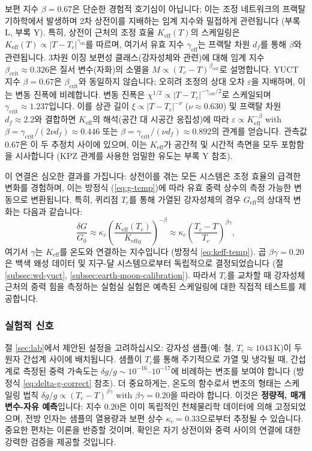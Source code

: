 \documentclass[11pt,a4paper]{article}
\newcommand{\Keff}{K_{\mathrm{eff}}}
\begin{document}
	보편 지수 $\beta = 0.67$은 단순한 경험적 호기심이 아닙니다; 이는 조정 네트워크의 프랙탈 기하학에서 발생하며 2차 상전이를 지배하는 임계 지수와 밀접하게 관련됩니다 (부록 L, 부록 Y). 특히, 상전이 근처의 조정 효율 $\Keff(T)$의 스케일링은 $\Keff(T) \propto |T - T_c|^{\gamma_{\mathrm{eff}}}$를 따르며, 여기서 유효 지수 $\gamma_{\mathrm{eff}}$는 프랙탈 차원 $d_f$를 통해 $\beta$와 관련됩니다. 3차원 이징 보편성 클래스(강자성체와 관련)에 대해 임계 지수 $\beta_{\mathrm{crit}} \approx 0.326$은 질서 변수(자화)의 소멸을 $M \propto (T_c - T)^{\beta_{\mathrm{crit}}}$로 설명합니다. YUCT 지수 $\beta = 0.67$은 $\beta_{\mathrm{crit}}$와 동일하지 않습니다; 오히려 조정의 상대 오차 $\varepsilon$을 지배하며, 이는 변동 진폭에 비례합니다. 변동 진폭은 $\chi^{1/2} \propto |T - T_c|^{-\gamma_{\mathrm{crit}}/2}$로 스케일되며 $\gamma_{\mathrm{crit}} \approx 1.237$입니다. 이를 상관 길이 $\xi \propto |T - T_c|^{-\nu}$ ($\nu \approx 0.630$) 및 프랙탈 차원 $d_f \approx 2.2$와 결합하면 $\Keff$의 해석(공간 대 시공간 응집성)에 따라 $\varepsilon \propto \Keff^{-\beta}$ with $\beta = \gamma_{\mathrm{crit}}/(2\nu d_f) \approx 0.446$ 또는 $\beta = \gamma_{\mathrm{crit}}/(\nu d_f) \approx 0.892$의 관계를 얻습니다. 관측값 0.67은 이 두 추정치 사이에 있으며, 이는 $\Keff$가 공간적 및 시간적 측면을 모두 포함함을 시사합니다 (KPZ 관계를 사용한 엄밀한 유도는 부록 Y 참조).
	
	이 연결은 심오한 결과를 가집니다: 상전이를 겪는 모든 시스템은 조정 효율의 급격한 변화를 경험하며, 이는 방정식 (\ref{eq:g-temp})에 따라 유효 중력 상수의 측정 가능한 변동으로 변환됩니다. 특히, 퀴리점 $T_c$를 통해 가열된 강자성체의 경우 $G_{\mathrm{eff}}$의 상대적 변화는 다음과 같습니다:
	\[
	\frac{\delta G}{G_0} \approx \kappa_c \left( \frac{\Keff(T_c)}{{\Keff}_{0}} \right)^{-\beta} \approx \kappa_c \left( \frac{T_c - T}{T_c} \right)^{\beta\gamma},
	\]
	여기서 $\gamma$는 $\Keff$를 온도와 연결하는 지수입니다 (방정식 \ref{eq:keff-temp}). 곱 $\beta\gamma = 0.20$은 백색 왜성 데이터 및 지구-달 시스템으로부터 독립적으로 결정되었습니다 (절 \ref{subsec:wd-yuct}, \ref{subsec:earth-moon-calibration}). 따라서 $T_c$를 교차할 때 강자성체 근처의 중력 힘을 측정하는 실험실 실험은 예측된 스케일링에 대한 직접적 테스트를 제공합니다.
	
	\subsubsection{실험적 신호}
	절 \ref{sec:lab}에서 제안된 설정을 고려하십시오: 강자성 샘플(예: 철, $T_c \approx 1043\,\mathrm{K}$)이 두 원자 간섭계 사이에 배치됩니다. 샘플이 $T_c$를 통해 주기적으로 가열 및 냉각될 때, 간섭계로 측정된 중력 가속도는 $\delta g/g \sim 10^{-16}$–$10^{-17}$에 비례하는 변조를 보여야 합니다 (방정식 \ref{eq:delta-g-correct} 참조). 더 중요하게는, 온도의 함수로서 변조의 형태는 스케일링 법칙 $\delta g/g \propto (T_c - T)^{\beta\gamma}$ with $\beta\gamma = 0.20$을 따라야 합니다. 이것은 \textbf{정량적, 매개변수-자유 예측}입니다: 지수 $0.20$은 이미 독립적인 천체물리학 데이터에 의해 고정되었으며, 전방 인자는 샘플의 열용량과 보편 상수 $\kappa_c = 0.33$으로부터 추정될 수 있습니다. 중요한 편차는 이론을 반증할 것이며, 확인은 자기 상전이와 중력 사이의 연결에 대한 강력한 검증을 제공할 것입니다.
	
\end{document}
